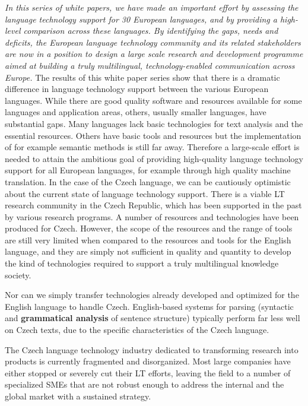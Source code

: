 \documentclass[]{../../metanetpaper}
\begin{document}
\begin{multicols}{2}
\emph{In this series of white papers, we have made an important effort by assessing the language technology support for 30 European languages, and by providing a high-level comparison across these languages. By identifying the gaps, needs and deficits, the European language technology community and its related stakeholders are now in a position to design a large scale research and development programme aimed at building a truly multilingual, technology-enabled communication across Europe.}
The results of this white paper series show that there is a dramatic difference in language technology support between the various European languages. While there are good quality software and resources available for some languages and application areas, others, usually smaller languages, have substantial gaps. Many languages lack basic technologies for text analysis and the essential resources. Others have basic tools and resources but the implementation of for example semantic methods is still far away. Therefore a large-scale effort is needed to attain the ambitious goal of providing high-quality language technology support for all European languages, for example through high quality machine translation. 
In the case of the Czech language, we can be cautiously optimistic about the current state of language technology support. There is a viable LT research community in the Czech Republic, which has been supported in the past by various research programs. A number of resources and technologies have been produced for Czech. However, the scope of the resources and the range of tools are still very limited when compared to the resources and tools for the English language, and they are simply not sufficient in quality and quantity to develop the kind of technologies required to support a truly multilingual knowledge society.

Nor can we simply transfer technologies already developed and optimized for the English language to handle Czech. English-based systems for parsing (syntactic and \textbf{grammatical analysis} of sentence structure) typically perform far less well on Czech texts, due to the specific characteristics of the Czech language.

The Czech language technology industry dedicated to transforming research into products is currently fragmented and disorganized. Most large companies have either stopped or severely cut their LT efforts, leaving the field to a number of specialized SMEs that are not robust enough to address the internal and the global market with a sustained strategy. 


\end{multicols}
\end{document}
